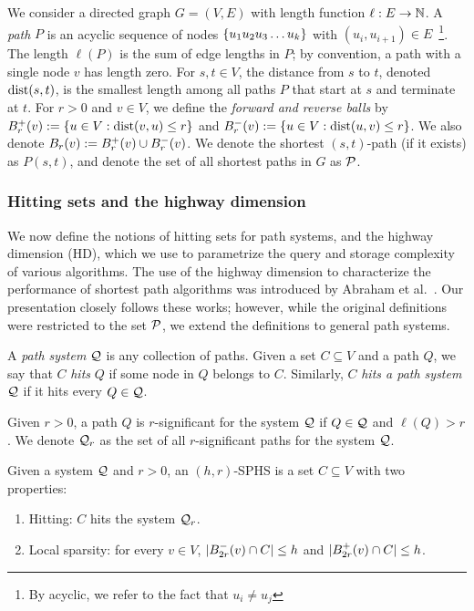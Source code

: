 
We consider a directed graph $G=(V,E)$ with length function $\ell:E\to \N$.
A \emph{path} $P$ is an acyclic sequence of nodes $\crl*{u_1u_2u_3\ldots u_k}$ with $(u_i,u_{i+1})\in E$~\footnote{By acyclic, we refer to the fact that $u_i\neq u_j$}. 
The length $\ell(P)$ is the sum of edge lengths in $P$; by convention, a path with a single node $v$ has length zero.
For $s,t\in V$, the distance from $s$ to $t$, denoted $\dist(s,t)$, is the smallest length among all paths $P$ that start at $s$ and terminate at $t$.
For $r>0$ and $v\in V$, we define the \emph{forward and reverse balls} by $\Bf_r(v):=\{u\in V: \dist(v,u)\leq r\}$ and $\Bb_r(v):=\{u\in V: \dist(u,v)\leq r\}$.
We also denote $B_r(v):=\Bf_r(v)\cup\Bb_r(v)$.
We denote the shortest $(s,t)$-path (if it exists) as $P(s,t)$, and denote the set of all shortest paths in $G$ as $\calP$.


\subsubsection{Hitting sets and the highway dimension}

We now define the notions of hitting sets for path systems, and the highway dimension (HD), which we use to parametrize the query and storage complexity of various algorithms. The use of the highway dimension to characterize the performance of shortest path algorithms was introduced by Abraham et al.~\citet{highway2010,highway2013}. Our presentation closely follows these works; however, while the original definitions were restricted to the set $\calP$, we extend the definitions to general path systems.

A \emph{path system} $\calQ$ is any collection of paths.
Given a set $C\subseteq V$ and a path $Q$, we say that $C$ \emph{hits} $Q$ if some node in $Q$ belongs to $C$.
Similarly, $C$ \emph{hits a path system} $\calQ$ if it hits every $Q\in\calQ$.


\begin{definition}
Given $r>0$, a path $Q$ is $r$-significant for the system $\calQ$ if $Q\in\calQ$ and $\ell(Q)>r$.
We denote $\calQ_r$ as the set of all $r$-significant paths for the system $\calQ$.
\end{definition}

\begin{definition}
Given a system $\calQ$ and $r>0$, an $(h,r)$-SPHS is a set $C\subseteq V$ with two properties: 
\begin{enumerate}
\item Hitting: $C$ hits the system $\calQ_r$.
\item Local sparsity: for every $v\in V$, $\card{\Bb_{2r}(v)\cap C}\leq h$ and $\card{\Bf_{2r}(v)\cap C}\leq h$.
\end{enumerate}
\end{definition}

